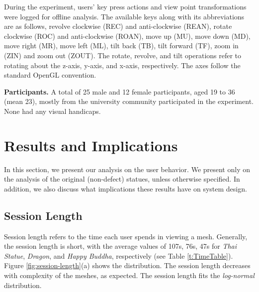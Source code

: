 During the experiment, users' key press actions and view point
transformations were logged for offline analysis. The available keys along
with its abbreviations are as follows, revolve clockwise (REC) and
anti-clockwise (REAN), rotate clockwise (ROC) and anti-clockwise (ROAN),
move up (MU), move down (MD), move right (MR), move left (ML), tilt back
(TB), tilt forward (TF), zoom in (ZIN) and zoom out (ZOUT). The rotate,
revolve, and tilt operations refer to rotating about the z-axis, y-axis, and
x-axis, respectively. The axes follow the standard OpenGL convention. 

\textbf{Participants.}
A total of 25 male and 12 female participants, aged 19 to 36
(mean 23), mostly from the university community participated in the
experiment. None had any visual handicaps.

\section{Results and Implications}

In this section, we present our analysis on the user behavior. We present only on the analysis of the original (non-defect) statues, unless otherwise specified.
In addition, we also discuss what implications these results have on system design.

\subsection{Session Length}
Session length refers to the time each user spends in viewing a mesh. 
Generally, the session length is short, with the average values of 107s, 76s, 47s for \textit{Thai Statue}, 
\textit{Dragon}, and \textit{Happy Buddha}, respectively (see Table \ref{t:TimeTable}). 
Figure \ref{fig:session-length}(a) shows the distribution. 
The session length decreases with complexity of the meshes, as expected. 
The session length fits the \textit{log-normal} distribution.


